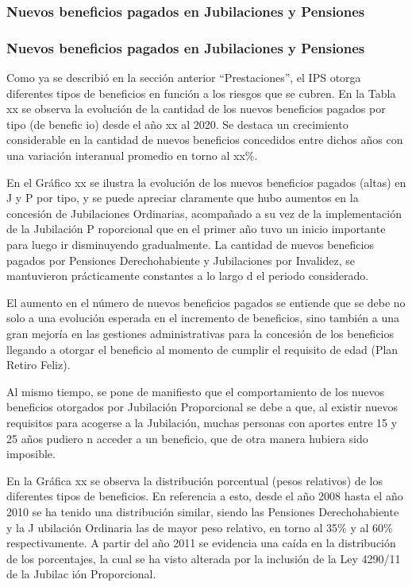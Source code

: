 \subsubsection{Nuevos beneficios pagados en Jubilaciones y Pensiones}

\subsubsection{Nuevos beneficios pagados en Jubilaciones y Pensiones}

Como ya se describió en la sección anterior ``Prestaciones'', el IPS
otorga diferentes tipos de beneficios en función a los riesgos que se
cubren. En la Tabla xx se observa la evolución de la cantidad de los
nuevos beneficios pagados por tipo (de benefic io) desde el año xx al
2020. Se destaca un crecimiento considerable en la cantidad de nuevos
beneficios concedidos entre dichos años con una variación interanual
promedio en torno al xx\%.

En el Gráfico xx se ilustra la evolución de los nuevos beneficios
pagados (altas) en J y P por tipo, y se puede apreciar claramente que
hubo aumentos en la concesión de Jubilaciones Ordinarias, acompañado a
su vez de la implementación de la Jubilación P roporcional que en el
primer año tuvo un inicio importante para luego ir disminuyendo
gradualmente. La cantidad de nuevos beneficios pagados por Pensiones
Derechohabiente y Jubilaciones por Invalidez, se mantuvieron
prácticamente constantes a lo largo d el periodo considerado.

El aumento en el número de nuevos beneficios pagados se entiende que se
debe no solo a una evolución esperada en el incremento de beneficios,
sino también a una gran mejoría en las gestiones administrativas para la
concesión de los beneficios llegando a otorgar el beneficio al momento
de cumplir el requisito de edad (Plan Retiro Feliz).

Al mismo tiempo, se pone de manifiesto que el comportamiento de los
nuevos beneficios otorgados por Jubilación Proporcional se debe a que,
al existir nuevos requisitos para acogerse a la Jubilación, muchas
personas con aportes entre 15 y 25 años pudiero n acceder a un
beneficio, que de otra manera hubiera sido imposible.

En la Gráfica xx se observa la distribución porcentual (pesos relativos)
de los diferentes tipos de beneficios. En referencia a esto, desde el
año 2008 hasta el año 2010 se ha tenido una distribución similar, siendo
las Pensiones Derechohabiente y la J ubilación Ordinaria las de mayor
peso relativo, en torno al 35\% y al 60\% respectivamente. A partir del
año 2011 se evidencia una caída en la distribución de los porcentajes,
la cual se ha visto alterada por la inclusión de la Ley 4290/11 de la
Jubilac ión Proporcional.

